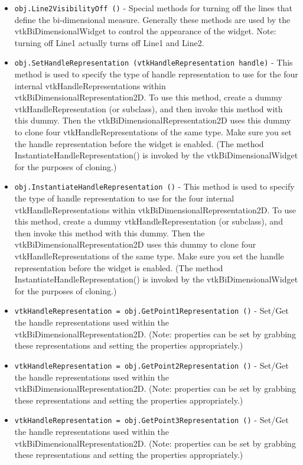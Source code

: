 \begin{itemize}
\item  \verb|obj.Line2VisibilityOff ()| -  Special methods for turning off the lines that define the bi-dimensional
 measure. Generally these methods are used by the vtkBiDimensionalWidget to
 control the appearance of the widget. Note: turning off Line1 actually turns
 off Line1 and Line2.

\item  \verb|obj.SetHandleRepresentation (vtkHandleRepresentation handle)| -  This method is used to specify the type of handle representation to use
 for the four internal vtkHandleRepresentations within
 vtkBiDimensionalRepresentation2D.  To use this method, create a dummy
 vtkHandleRepresentation (or subclass), and then invoke this method with
 this dummy. Then the vtkBiDimensionalRepresentation2D uses this dummy to
 clone four vtkHandleRepresentations of the same type. Make sure you set the
 handle representation before the widget is enabled. (The method
 InstantiateHandleRepresentation() is invoked by the vtkBiDimensionalWidget
 for the purposes of cloning.)

\item  \verb|obj.InstantiateHandleRepresentation ()| -  This method is used to specify the type of handle representation to use
 for the four internal vtkHandleRepresentations within
 vtkBiDimensionalRepresentation2D.  To use this method, create a dummy
 vtkHandleRepresentation (or subclass), and then invoke this method with
 this dummy. Then the vtkBiDimensionalRepresentation2D uses this dummy to
 clone four vtkHandleRepresentations of the same type. Make sure you set the
 handle representation before the widget is enabled. (The method
 InstantiateHandleRepresentation() is invoked by the vtkBiDimensionalWidget
 for the purposes of cloning.)

\item  \verb|vtkHandleRepresentation = obj.GetPoint1Representation ()| -  Set/Get the handle representations used within the
 vtkBiDimensionalRepresentation2D. (Note: properties can be set by
 grabbing these representations and setting the properties
 appropriately.)

\item  \verb|vtkHandleRepresentation = obj.GetPoint2Representation ()| -  Set/Get the handle representations used within the
 vtkBiDimensionalRepresentation2D. (Note: properties can be set by
 grabbing these representations and setting the properties
 appropriately.)

\item  \verb|vtkHandleRepresentation = obj.GetPoint3Representation ()| -  Set/Get the handle representations used within the
 vtkBiDimensionalRepresentation2D. (Note: properties can be set by
 grabbing these representations and setting the properties
 appropriately.)


\end{itemize}
